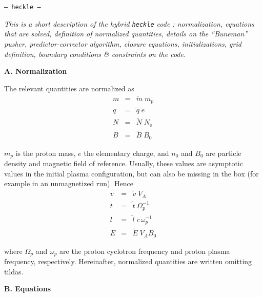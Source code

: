 \documentclass[a4paper,11pt]{letter}
\begin{document}
\begin{center}
{\tt --- heckle ---}
\end{center}

\bigskip
\bigskip
\bigskip

{\it This is a short description of the hybrid {\tt heckle} code : normalization, equations that are solved, definition of normalized quantities, details on the ``Buneman'' pusher, predictor-corrector algorithm, closure equations, initializations, grid definition, boundary conditions \& constraints on the code.}

\bigskip

{\bf A. Normalization}

The relevant quantities are normalized as
\begin{eqnarray*}
m & = & \widetilde{m} \; m_p \\
q & = & \widetilde{q} \; e \\
N & = & \widetilde{N} \; N_o \\
B & = & \widetilde{B} \; B_0
\end{eqnarray*}

\noindent
$m_p$ is the proton mass, $e$ the elementary charge, and $n_0$ and $B_0$
are particle density and magnetic field of reference. Usually, these values are asymptotic values in the initial plasma configuration, but can also be missing in the box (for example in an unmagnetized run). Hence
\begin{eqnarray*}
v & = & \widetilde{v} \; V_A \\
t & = & \widetilde{t} \; \Omega_{p}^{-1} \\
l & = & \widetilde{l} \; c \, \omega_{p}^{-1} \\
E & = & \widetilde{E} \; V_A B_0
\end{eqnarray*}

where $\Omega_{p}$ and $\omega_{p}$ are the proton cyclotron frequency and proton plasma frequency, respectively. Hereinafter, normalized quantities are written omitting tildas.

\newpage

{\bf B. Equations}
\end{document}
